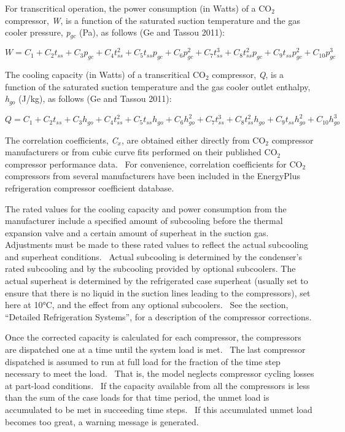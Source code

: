For transcritical operation, the power consumption (in Watts) of a CO\(_{2}\) compressor, \emph{W}, is a function of the saturated suction temperature and the gas cooler pressure, \emph{p\(_{gc}\)} (Pa), as follows (Ge and Tassou 2011):

\begin{equation}
W = {C_1} + {C_2}{t_{ss}} + {C_3}{p_{gc}} + {C_4}t_{ss}^2 + {C_5}{t_{ss}}{p_{gc}} + {C_6}p_{gc}^2 + {C_7}t_{ss}^3 + {C_8}t_{ss}^2{p_{gc}} + {C_9}{t_{ss}}p_{gc}^2 + {C_{10}}p_{gc}^3
\end{equation}

The cooling capacity (in Watts) of a transcritical CO\(_{2}\) compressor, \emph{Q}, is a function of the saturated suction temperature and the gas cooler outlet enthalpy, \emph{h\(_{go}\)} (J/kg), as follows (Ge and Tassou 2011):

\begin{equation}
Q = {C_1} + {C_2}{t_{ss}} + {C_3}{h_{go}} + {C_4}t_{ss}^2 + {C_5}{t_{ss}}{h_{go}} + {C_6}h_{go}^2 + {C_7}t_{ss}^3 + {C_8}t_{ss}^2{h_{go}} + {C_9}{t_{ss}}h_{go}^2 + {C_{10}}h_{go}^3
\end{equation}

The correlation coefficients, \emph{C\(_{x}\)}, are obtained either directly from CO\(_{2}\) compressor manufacturers or from cubic curve fits performed on their published CO\(_{2}\) compressor performance data.~ For convenience, correlation coefficients for CO\(_{2}\) compressors from several manufacturers have been included in the EnergyPlus refrigeration compressor coefficient database.

The rated values for the cooling capacity and power consumption from the manufacturer include a specified amount of subcooling before the thermal expansion valve and a certain amount of superheat in the suction gas.~ Adjustments must be made to these rated values to reflect the actual subcooling and superheat conditions.~ Actual subcooling is determined by the condenser's rated subcooling and by the subcooling provided by optional subcoolers. The actual superheat is determined by the refrigerated case superheat (usually set to ensure that there is no liquid in the suction lines leading to the compressors), set here at 10°C, and the effect from any optional subcoolers.~ See the section, ``Detailed Refrigeration Systems'', for a description of the compressor corrections.

Once the corrected capacity is calculated for each compressor, the compressors are dispatched one at a time until the system load is met.~ The last compressor dispatched is assumed to run at full load for the fraction of the time step necessary to meet the load.~ That is, the model neglects compressor cycling losses at part-load conditions.~ If the capacity available from all the compressors is less than the sum of the case loads for that time period, the unmet load is accumulated to be met in succeeding time steps.~ If this accumulated unmet load becomes too great, a warning message is generated.

